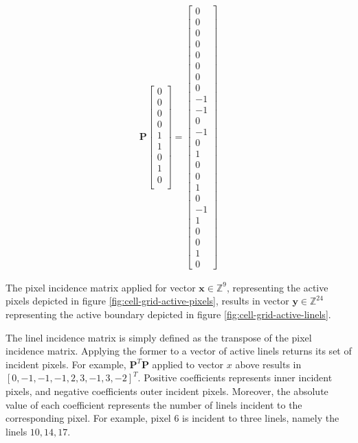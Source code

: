 \begin{example}
\[\begin{array}{ll}
	\mathbf{P} \left[ \begin{array}{l}
					0\\
					0\\
					0\\
					0\\
					1\\
					1\\
					0\\
					1\\
					0\\
					\end{array}\right] =  \left[ \begin{array}{l}
											0\\
											0\\
											0\\
											0\\
											0\\
											0\\
											0\\
											0\\
											-1\\
											-1\\
											0\\
											-1\\
											0\\
											1\\
											0\\
											0\\
											1\\
											0\\
											-1\\
											1\\
											0\\
											0\\
											1\\
											0
										\end{array}\right]
	 
   \end{array}
\]



The pixel incidence matrix applied for vector $\mathbf{x} \in \mathbb{Z}^9$, representing the active pixels depicted in figure \ref{fig:cell-grid-active-pixels}, results in vector $\mathbf{y} \in \mathbb{Z}^{24}$ representing the active boundary depicted in figure \ref{fig:cell-grid-active-linels}.

The linel incidence matrix is simply defined as the transpose of the pixel incidence matrix. Applying the former to a vector of active linels returns its set of incident pixels. For example, $\mathbf{P}^{T}\mathbf{P}$ applied to vector $x$ above results in $[0,-1,-1,-1,2,3,-1,3,-2]^T$. Positive coefficients represents inner incident pixels, and negative coefficients outer incident pixels. Moreover, the absolute value of each coefficient represents the number of linels incident to the corresponding pixel. For example, pixel $6$ is incident to three linels, namely the linels $10,14,17$.

\end{example}


